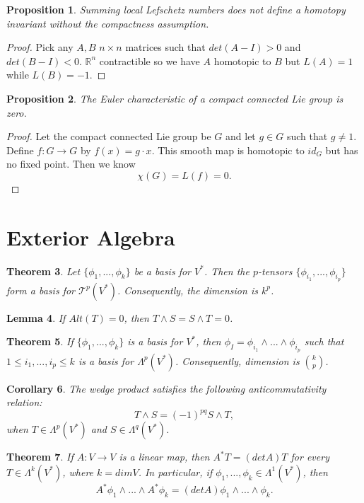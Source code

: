 \documentclass[psamsfonts]{amsart}
\newtheorem{theorem}{Theorem}[section]
\newtheorem{cor}[theorem]{Corollary}
\newtheorem{prop}[theorem]{Proposition}
\newtheorem{lem}[theorem]{Lemma}
\theoremstyle{definition}
\theoremstyle{remark}
\numberwithin{equation}{section}
\begin{document}
		\begin{prop}
			Summing local Lefschetz numbers does not define a homotopy invariant without the compactness assumption.
		\end{prop}
		\begin{proof}
			Pick any $A,B$ $n \times n$ matrices such that $det(A-I)>0$ and $det(B-I)<0$. $\mathbb{R}^n$ contractible so we have $A$ homotopic to $B$ but $L(A) = 1$ while $L(B) = -1$.
		\end{proof}
		\begin{prop}
			The Euler characteristic of a compact connected Lie group is zero.
		\end{prop}
		\begin{proof}
			Let the compact connected Lie group be $G$ and let $g \in G$ such that $g \neq 1$. Define $f: G \to G$ by $f(x) = g \cdot x$. This smooth map is homotopic to $id_G$ but has no fixed point. Then we know
			\begin{equation}
				\chi (G) = L(f) = 0.
			\end{equation}
		\end{proof}
	\section{Exterior Algebra}
		\begin{theorem}
			Let $\{ \phi_1,...,\phi_k \}$ be a basis for $V^*$. Then the $p$-tensors $\{ \phi_{i_1},..., \phi_{i_p} \}$ form a basis for $\mathcal{T}^p(V^*)$. Consequently, the dimension is $k^p$.
		\end{theorem}
		\begin{lem}
			If $Alt(T) = 0$, then $T \wedge S = S \wedge T = 0$.
		\end{lem}
		\begin{theorem}
			If $\{ \phi_1,...,\phi_k \}$ is a basis for $V^*$, then $\phi_I = \phi_{i_1} \wedge ... \wedge \phi_{i_p}$ such that $1 \leq i_1,...,i_p \leq k$ is a basis for $\Lambda^p(V^*)$. Consequently,
dimension is ${k \choose{p}}$.
		\end{theorem}
		\begin{cor}
			The wedge product satisfies the following anticommutativity relation:
			\begin{equation}
				T \wedge S = (-1)^{pq} S \wedge T,
			\end{equation}
			when $T \in \Lambda^p(V^*)$ and $S \in \Lambda^q(V^*)$.
		\end{cor}
		\begin{theorem}
			If $A: V \to V$ is a linear map, then $A^*T = (detA)T$ for every $T \in \Lambda^k(V^*)$, where $k = dim V$. In particular, if $\phi_1,...,\phi_k \in \Lambda^1(V^*)$, then
			\begin{equation}
				A^*\phi_1 \wedge ... \wedge A^*\phi_k = (det A)\phi_1 \wedge ... \wedge \phi_k.
			\end{equation}
		\end{theorem}
\end{document}
